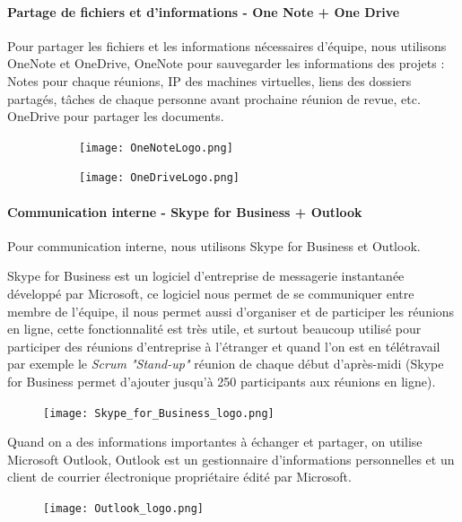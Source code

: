     
    \paragraph{Partage de fichiers et d'informations - One Note + One Drive }
    Pour partager les fichiers et les informations nécessaires d'équipe, nous utilisons OneNote et OneDrive, OneNote pour sauvegarder les informations des projets : Notes pour chaque réunions, IP des machines virtuelles, liens des dossiers partagés, tâches de chaque personne avant prochaine réunion de revue, etc. OneDrive pour partager les documents.
    
    \begin{figure}[H]
    	\flushleft
    	\begin{subfigure}[b]{.2\textwidth}
    		\texttt{[image: OneNoteLogo.png]}
    	\end{subfigure}
    	\begin{subfigure}[b]{.2\textwidth}
    		\texttt{[image: OneDriveLogo.png]}
    	\end{subfigure}
    	\label{fig:oneNote_oneDrive_label}
    \end{figure}
    
    \paragraph{Communication interne - Skype for Business + Outlook}
    Pour communication interne, nous utilisons Skype for Business et Outlook.
    
    \par Skype for Business est un logiciel d'entreprise de messagerie instantanée développé par Microsoft, ce logiciel nous permet de se communiquer entre membre de l'équipe, il nous permet aussi d'organiser et de participer les réunions en ligne, cette fonctionnalité est très utile, et surtout beaucoup utilisé pour participer des réunions d'entreprise à l'étranger et quand l'on est en télétravail par exemple le \textit{Scrum "Stand-up"} réunion de chaque début d'après-midi (Skype for Business permet d'ajouter jusqu'à 250 participants aux réunions en ligne).
    \begin{figure}[H]
    	\flushleft
    	\texttt{[image: Skype\_for\_Business\_logo.png]}
    	\label{skype_lable}
    \end{figure}
    
    \newpage
    
    \par Quand on a des informations importantes à échanger et partager, on utilise Microsoft Outlook, Outlook est un gestionnaire d'informations personnelles et un client de courrier électronique propriétaire édité par Microsoft. 
    \begin{figure}[H]
    	\flushleft
    	\texttt{[image: Outlook\_logo.png]}
    	\label{fig:outlook_label}
    \end{figure}
    
